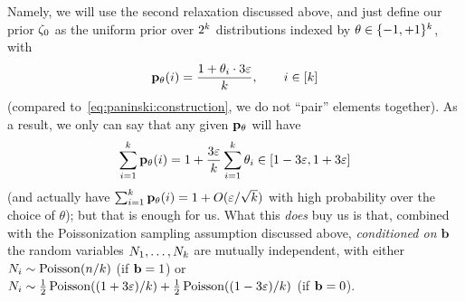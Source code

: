 Namely, we will use the second relaxation discussed above, and just define our prior $\zeta_0$ as the uniform prior over $2^k$ distributions indexed by $\theta\in\{-1,+1\}^k$, with
\begin{equation}
	\label{eq:notpaninski:construction}
	\mathbf{p}_\theta(i) = 
		\frac{1+\theta_{i} \cdot 3\varepsilon}{k}, \qquad i\in[k]
\end{equation}
(\ie compared to~\cref{eq:paninski:construction}, we do not ``pair'' elements together). As a result, we only can say that any given $\mathbf{p}_\theta$ will have
\begin{equation}
	\sum_{i=1}^k \mathbf{p}_\theta(i) = 1 + \frac{3\varepsilon}{k}\sum_{i=1}^k \theta_i \in [1-3\varepsilon,1+3\varepsilon]
\end{equation}
(and actually have $\sum_{i=1}^k \mathbf{p}_\theta(i) = 1+O(\varepsilon/\sqrt{k})$ with high probability over the choice of $\theta$); but that is enough for us. What this \emph{does} buy us is that, combined with the Poissonization sampling assumption discussed above, \emph{conditioned on $\mathbf{b}$} the random variables $N_1,\dots,N_k$ are mutually independent, with either $\occur_i\sim\poisson{\ns/\ab}$ (if $\mathbf{b}=1$) or $\occur_i\sim \frac{1}{2}\poisson{(1+3\dst)/\ab}+\frac{1}{2}\poisson{(1-3\dst)/\ab}$ (if $\mathbf{b}=0$).\medskip

